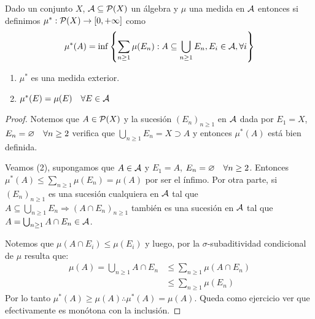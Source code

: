 \begin{theorem}
    Dado un conjunto \(X\), \(\mathcal{A} \subseteq \mathcal{P}(X)\) un álgebra y \(\mu\) una medida en \(\mathcal{A}\) entonces si definimos \(\mu^*: \mathcal{P}(X) \to [0, +\infty]\) como \begin{align*}
        \mu^*(A) = \inf \left\{ \sum_{n \geq 1} \mu(E_n) : A \subseteq \bigcup_{n \geq 1} E_n, E_i \in \mathcal{A}, \forall i \right\}
    \end{align*}
    \begin{enumerate}
        \item \(\mu^*\) es una medida exterior.
        \item \(\mu^*(E) = \mu(E) \quad \forall E \in \mathcal{A}\)
    \end{enumerate}

    \begin{proof}
        Notemos que \(A \in \mathcal{P}(X)\) y la sucesión \((E_n)_{n \geq 1}\) en \(\mathcal{A}\) dada por \(E_1 = X\), \(E_n = \varnothing \quad \forall n \geq 2\)
        verifica que \(\bigcup_{n \geq 1} E_n = X \supset A\) y entonces \(\mu^*(A)\) está bien definida.

        Veamos (2), supongamos que \(A \in \mathcal{A}\) y \(E_1 = A\), \(E_n = \varnothing \quad \forall n \geq 2\).
        Entonces \(\mu^*(A) \leq \sum_{n \geq 1} \mu(E_n) = \mu(A)\) por ser el ínfimo. Por otra parte, si \((E_n)_{n \geq 1}\) es una sucesión
        cualquiera en \(\mathcal{A}\) tal que \(A \subseteq \bigcup_{n \geq 1} E_n \Rightarrow (A \cap E_n)_{n \geq 1}\) también es una sucesión en \(\mathcal{A}\)
        tal que \(A = \bigcup_{n \geq 1} A \cap E_n \in \mathcal{A}\).

        Notemos que \(\mu(A \cap E_i) \leq \mu(E_i)\) y luego, por la \(\sigma\)-subaditividad condicional de \(\mu\) resulta que: \begin{align*}
            \mu(A) = \bigcup_{n \geq 1} A \cap E_n & \leq \sum_{n \geq 1} \mu(A \cap E_n) \\
                                                   & \leq \sum_{n \geq 1} \mu(E_n)
        \end{align*}
        Por lo tanto \(\mu^*(A) \geq \mu(A) \therefore \mu^*(A) = \mu(A)\). Queda como ejercicio ver que efectivamente es monótona con la inclusión.


\end{proof}
\end{theorem}
